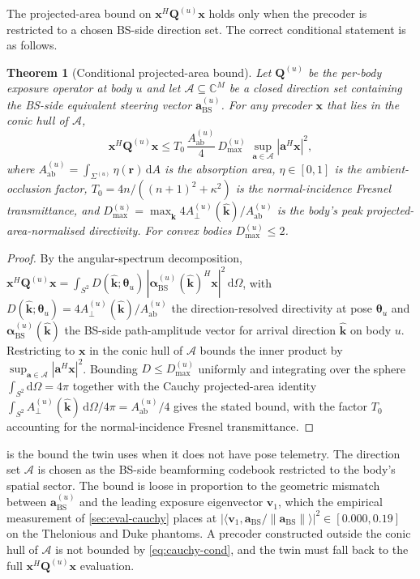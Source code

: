 \documentclass[journal,twocolumn,10pt]{IEEEtran}
\theoremstyle{plain}
\newtheorem{theorem}{Theorem}
\theoremstyle{remark}
\newcommand{\khat}{\hat{\bm{k}}}
\newcommand{\rr}{\mathbf{r}}
\newcommand{\xx}{\mathbf{x}}
\newcommand{\Aab}{A_{\mathrm{ab}}}
\newcommand{\Aperp}{A_\perp}
\newcommand{\Qmat}{\mathbf{Q}}
\newcommand{\diff}{\mathrm{d}}
\newcommand{\Complex}{\mathbb{C}}
\begin{document}
The projected-area bound on $\xx^H \Qmat^{(u)} \xx$ holds only when
the precoder is restricted to a chosen BS-side direction set. The
correct conditional statement is as follows.

\begin{theorem}[Conditional projected-area bound]\label{thm:cauchy-cond}
Let $\Qmat^{(u)}$ be the per-body exposure operator at body $u$ and
let $\mathcal{A} \subseteq \Complex^M$ be a closed direction set
containing the BS-side equivalent steering vector
$\mathbf{a}_{\mathrm{BS}}^{(u)}$. For any precoder $\xx$ that lies in
the conic hull of $\mathcal{A}$,
\begin{equation}\label{eq:cauchy-cond}
  \xx^H \Qmat^{(u)} \xx \leq T_0\,\frac{\Aab^{(u)}}{4}\,
  D_{\max}^{(u)}\;\sup_{\mathbf{a} \in \mathcal{A}}
  |\mathbf{a}^H \xx|^2,
\end{equation}
where $\Aab^{(u)} = \int_{\Sigma^{(u)}} \eta(\rr)\,\diff A$ is the
absorption area, $\eta \in [0,1]$ is the ambient-occlusion factor,
$T_0 = 4 n / ((n+1)^2 + \kappa^2)$ is the normal-incidence Fresnel
transmittance, and $D_{\max}^{(u)} = \max_{\khat}
4\Aperp^{(u)}(\khat)/\Aab^{(u)}$ is the body's peak
projected-area-normalised directivity. For convex bodies
$D_{\max}^{(u)} \leq 2$.
\end{theorem}

\begin{proof}
By the angular-spectrum decomposition,
$\xx^H \Qmat^{(u)} \xx = \int_{S^2} D(\khat;\bm\theta_u)\,
|\bm\alpha_{\mathrm{BS}}^{(u)}(\khat)^H \xx|^2\,\diff\Omega$,
with $D(\khat;\bm\theta_u) = 4 \Aperp^{(u)}(\khat)/\Aab^{(u)}$ the
direction-resolved directivity at pose $\bm\theta_u$ and
$\bm\alpha_{\mathrm{BS}}^{(u)}(\khat)$ the BS-side path-amplitude
vector for arrival direction $\khat$ on body $u$. Restricting to
$\xx$ in the conic hull of $\mathcal{A}$ bounds the inner product by
$\sup_{\mathbf{a} \in \mathcal{A}} |\mathbf{a}^H \xx|^2$. Bounding
$D \leq D_{\max}^{(u)}$ uniformly and integrating over the sphere
$\int_{S^2} \diff\Omega = 4\pi$ together with the Cauchy
projected-area identity
$\int_{S^2} \Aperp^{(u)}(\khat)\,\diff\Omega/4\pi = \Aab^{(u)}/4$
gives the stated bound, with the factor $T_0$ accounting for the
normal-incidence Fresnel transmittance.
\end{proof}

 is the bound the twin uses when it does not
have pose telemetry. The direction set $\mathcal{A}$ is chosen as
the BS-side beamforming codebook restricted to the body's spatial
sector. The bound is loose in proportion to the geometric mismatch
between $\mathbf{a}_{\mathrm{BS}}^{(u)}$ and the leading exposure
eigenvector $\mathbf{v}_1$, which the empirical measurement of
\cref{sec:eval-cauchy} places at $|\langle \mathbf{v}_1,
\mathbf{a}_{\mathrm{BS}}/\|\mathbf{a}_{\mathrm{BS}}\| \rangle|^2 \in
[0.000, 0.19]$ on the Thelonious and Duke phantoms. A precoder
constructed outside the conic hull of $\mathcal{A}$ is not bounded
by \cref{eq:cauchy-cond}, and the twin must fall back to the full
$\xx^H \Qmat^{(u)} \xx$ evaluation.




\end{document}
